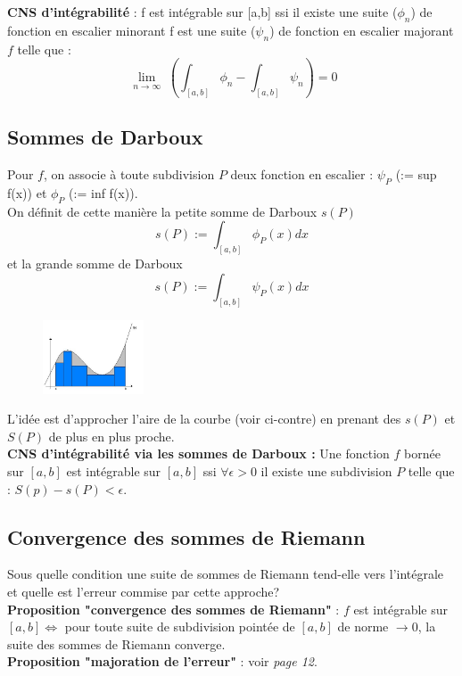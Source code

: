 \documentclass	[11pt, a4paper, openany]{book}
\begin{document}
\textbf{CNS d'intégrabilité} : f est intégrable sur [a,b] ssi il existe une suite ($\phi_n$) de fonction en escalier minorant f est une suite ($\psi_n$) de fonction en escalier majorant $f$ telle que : 
$$\lim\limits_{\substack{n \to \infty}} \left(\int_{[a,b]} \phi_n - \int_{[a,b]} \psi_n \right) = 0$$

\subsection{Sommes de Darboux}
Pour $f$, on associe à toute subdivision $P$ deux fonction en escalier : $\psi_P$ (:= sup f(x)) et $\phi_P$ (:= inf f(x)).\\
On définit de cette manière la petite somme de Darboux $s(P)$
$$s(P) := \int_{[a,b]} \phi_P(x) dx$$
et la grande somme de Darboux
$$s(P) := \int_{[a,b]} \psi_P(x) dx$$
\begin{figure}
\includegraphics[width=3cm]{image2.jpg}
\end{figure}
L'idée est d'approcher l'aire de la courbe (voir ci-contre) en prenant des $s(P)$ et $S(P)$ de plus en plus proche.\\

\textbf{CNS d'intégrabilité via les sommes de Darboux :} Une fonction $f$ bornée sur $[a,b]$ est intégrable sur $[a,b]$ ssi $\forall \epsilon > 0$ il existe une subdivision $P$ telle que : $S(p) - s(P) < \epsilon$.

\subsection{Convergence des sommes de Riemann}
Sous quelle condition une suite de sommes de Riemann tend-elle vers l'intégrale et quelle est l'erreur commise par cette approche?\\

\textbf{Proposition "convergence des sommes de Riemann"} : $f$ est intégrable sur $[a,b] \Leftrightarrow$ pour toute suite de subdivision pointée de $[a,b]$ de norme $\rightarrow 0$, la suite des sommes de Riemann converge.\\

\textbf{Proposition "majoration de l'erreur"} : voir \textit{page 12}.
\end{document}
